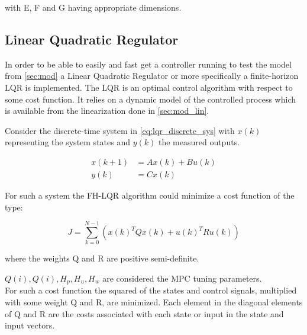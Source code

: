 \noindent with E, F and G having appropriate dimensions.


\subsection{Linear Quadratic Regulator}
In order to be able to easily and fast get a controller running to test the model from \cref{sec:mod} a Linear Quadratic Regulator or more specifically a finite-horizon LQR is implemented. The LQR is an optimal control algorithm with respect to some cost function. It relies on a dynamic model of the controlled process which is available from the linearization done in \cref{sec:mod_lin}.

Consider the discrete-time system in \cref{eq:lqr_discrete_sys} with $x(k)$ representing the system states and $y(k)$ the measured outputs.

\begin{equation} \label{eq:lqr_discrete_sys}
	\begin{split}
		x(k+1) 	& = Ax(k) + Bu(k) \\
		y(k) 	& = Cx(k)
	\end{split}
\end{equation}

For such a system the FH-LQR algorithm could minimize a cost function of the type:

\begin{equation} \label{eq:lqr_cost_fcn}
	J = \sum_{k=0}^{N-1}\left( x(k)^TQx(k) + u(k)^TRu(k) \right)
\end{equation}

where the weights Q and R are positive semi-definite.


$Q(i), Q(i), H_p, H_u, H_w$ are considered the MPC tuning parameters.\\

For such a cost function the squared of the states and control signals, multiplied with some weight Q and R, are minimized. Each element in the diagonal elements of Q and R are the costs associated with each state or input in the state and input vectors.








